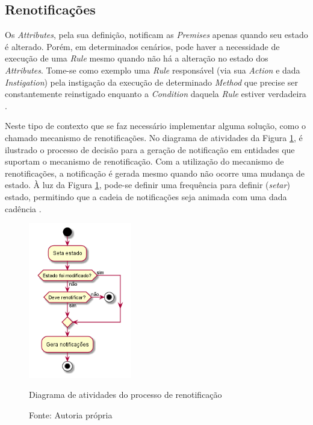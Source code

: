 \subsection{Renotificações}

Os \textit{Attributes}, pela sua definição, notificam as \textit{Premises}
apenas quando seu estado é alterado. Porém, em determinados cenários, pode haver
a necessidade de execução de uma \textit{Rule} mesmo quando não há a alteração
no estado dos \textit{Attributes}. Tome-se como exemplo uma \textit{Rule}
responsável (via sua \textit{Action} e dada \textit{Instigation}) pela
instigação da execução de determinado \textit{Method} que precise ser
constantemente reinstigado enquanto a \textit{Condition} daquela \textit{Rule}
estiver verdadeira \cite{msc_Banaszewski_2009}.

Neste tipo de contexto que se faz necessário implementar alguma solução, como o
chamado mecanismo de renotificações. No diagrama de atividades da Figura
\ref{fig:renotif_activity}, é ilustrado o processo de decisão para a geração de
notificação em entidades que suportam o mecanismo de renotificação. Com a
utilização do mecanismo de renotificações, a notificação é gerada mesmo quando
não ocorre uma mudança de estado. À luz da Figura \ref{fig:renotif_activity},
pode-se definir uma frequência para definir (\textit{setar}) estado, permitindo
que a cadeia de notificações seja animada com uma dada cadência
\cite{msc_Banaszewski_2009}.

\begin{figure}[!htb]
  \centering
  \includegraphics[width=0.4\textwidth]{../out/diagrams/renotification/renotif.png}
  \smallskip
  \caption{Diagrama de atividades do processo de renotificação}
  \caption*{Fonte: Autoria própria}
  \label{fig:renotif_activity}
\end{figure}

